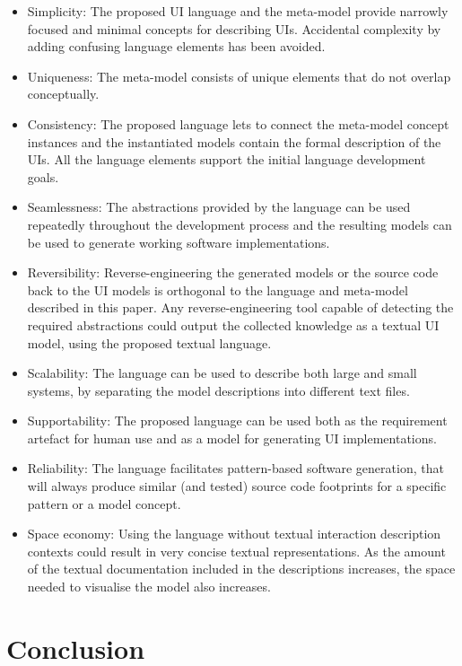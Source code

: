 \documentclass[conference]{IEEEtran}
\begin{document}
\begin{itemize}
  \item Simplicity: The proposed UI language and the meta-model provide
    narrowly focused and minimal concepts for describing UIs. Accidental
    complexity by adding confusing language elements has been avoided.
  \item Uniqueness: The meta-model consists of unique elements that do not
    overlap conceptually.
  \item Consistency: The proposed language lets to connect the meta-model
    concept instances and the instantiated models contain the formal
    description of the UIs. All the language elements support the initial
    language development goals.
  \item Seamlessness: The abstractions provided by the language can be used
    repeatedly throughout the development process and the resulting models
    can be used to generate working software implementations.
  \item Reversibility: Reverse-engineering the generated models or the source
    code back to the UI models is orthogonal to the language and meta-model
    described in this paper. Any reverse-engineering tool capable of detecting
    the required abstractions could output the collected knowledge as a textual
    UI model, using the proposed textual language.
  \item Scalability: The language can be used to describe both large and small
    systems, by separating the model descriptions into different text files.
  \item Supportability: The proposed language can be used both as the
    requirement artefact for human use and as a model for generating UI
    implementations.
  \item Reliability: The language facilitates pattern-based software
    generation, that will always produce similar (and tested) source code
    footprints for a specific pattern or a model concept.
  \item Space economy: Using the language without textual interaction
    description contexts could result in very concise textual representations.
    As the amount of the textual documentation included in the descriptions
    increases, the space needed to visualise the model also increases.
\end{itemize}

\section{Conclusion}
\end{document}

